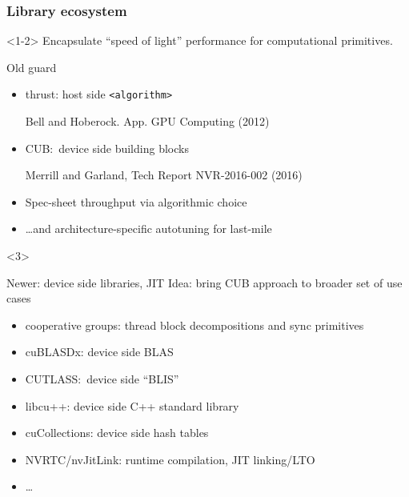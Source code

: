 \documentclass[aspectratio=169]{beamer}
\begin{document}
\begin{frame}[fragile]
  \frametitle{Library ecosystem}
  \begin{onlyenv}<1-2>
    Encapsulate ``speed of light'' performance for computational
    primitives. 
    \pause

    \begin{block}{Old guard}
      \begin{itemize}
      \item thrust: host side \verb~<algorithm>~

        {\scriptsize
          \raggedleft
          Bell and Hoberock. App. GPU Computing (2012)
          \par
        }
      \item CUB:~device side building blocks

        {\scriptsize
          \raggedleft
          Merrill and Garland, Tech Report NVR-2016-002 (2016)
          \par
        }
      \item Spec-sheet throughput via algorithmic choice
      \item \dots and architecture-specific autotuning for last-mile
      \end{itemize}
    \end{block}
  \end{onlyenv}
  
  \begin{onlyenv}<3>
    \begin{block}{Newer: device side libraries, JIT}
      Idea: bring CUB approach to broader set of use cases
      \begin{itemize}
      \item cooperative groups: thread block decompositions and sync
        primitives
      \item cuBLASDx: device side BLAS
      \item CUTLASS:~device side ``BLIS''
      \item libcu++: device side C++ standard library
      \item cuCollections: device side hash tables
      \item NVRTC/nvJitLink: runtime compilation, JIT linking/LTO
      \item \dots
      \end{itemize}
    \end{block}
  \end{onlyenv}
\end{frame}
\end{document}
